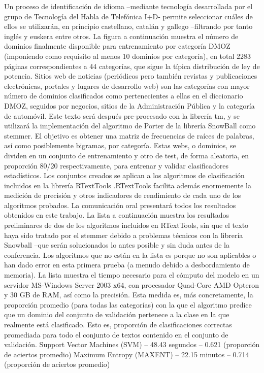 Un proceso de identificación de idioma –mediante tecnología desarrollada por el grupo de Tecnología del Habla de Telefónica I+D- permite seleccionar cuáles de ellos se utilizarán, en principio castellano, catalán y gallego –filtrando por tanto inglés y euskera entre otros. La figura a continuación muestra el número de dominios finalmente disponible para entrenamiento por categoría DMOZ (imponiendo como requisito al menos 10 dominios por categoría), en total 2283 páginas correspondientes a 44 categorías, que sigue la típica  distribución de ley de potencia. Sitios web de noticias (periódicos pero también revistas y publicaciones electrónicas, portales y lugares de desarrollo web) son las categorías con mayor  número de dominios clasificados como pertenecientes a ellas en el diccionario DMOZ, seguidos por negocios, sitios de la Administración Pública y la categoría de automóvil.
Este texto será después pre-procesado con la librería tm, y se utilizará la implementación del algoritmo de Porter de la librería SnowBall como stemmer. El objetivo es obtener una matriz de frecuencias de raíces de palabras, así como posiblemente bigramas, por categoría.
Estas webs, o dominios, se dividen en un conjunto de entrenamiento y otro de test, de forma aleatoria, en proporción 80/20 respectivamente, para entrenar y validar clasificadores estadísticos.
Los conjuntos creados se aplican a los algoritmos de clasificación incluidos en la librería RTextTools .RTextTools facilita además enormemente la medición de precisión y otros indicadores de rendimiento de cada uno de los algoritmos probados. La comunicación oral presentará todos los resultados obtenidos en este trabajo. 
La lista a continuación muestra los resultados preliminares de dos de los algoritmos incluidos en RTextTools, sin que el texto haya sido tratado por el stemmer debido a problemas técnicos con la librería Snowball –que serán solucionados lo antes posible y sin duda antes de la conferencia. 
Los algoritmos que no están en la lista es porque no son aplicables o han dado error en esta primera prueba (a menudo debido a desbordamiento de memoria). La lista muestra el tiempo necesario para el cómputo del modelo en un servidor MS-Windows Server 2003 x64, con procesador Quad-Core AMD Opteron y 30 GB de RAM, así como la precisión. Esta medida es, más concretamente, la proporción promedio (para todas las categorías) con la que el algoritmo predice que un dominio del conjunto de validación pertenece a la clase en la que realmente está clasificado. Esto es, proporción de clasificaciones correctas promediada para todo el conjunto de textos contenido en el conjunto de validación. 
Support Vector Machines (SVM) – 48.43 segundos – 0.621 (proporción de aciertos promedio)
Maximum Entropy (MAXENT) – 22.15 minutos – 0.714 (proporción de aciertos promedio)

